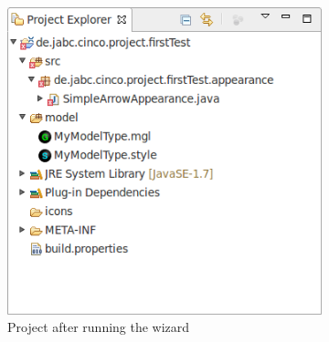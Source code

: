 \documentclass[a4paper,american,12pt]{scrreprt}
\begin{document}
\begin{figure}
	\centering
	\begin{subfigure}[t]{0.40\textwidth}
		\includegraphics[width=\textwidth]{screenshots/example-cp-pregen.png}
		\caption{Project after running the wizard}
		\label{fig:cpPreGen}
	\end{subfigure}
	\qquad
	\begin{subfigure}[t]{0.40\textwidth}

\end{subfigure}
\end{figure}
\end{document}
